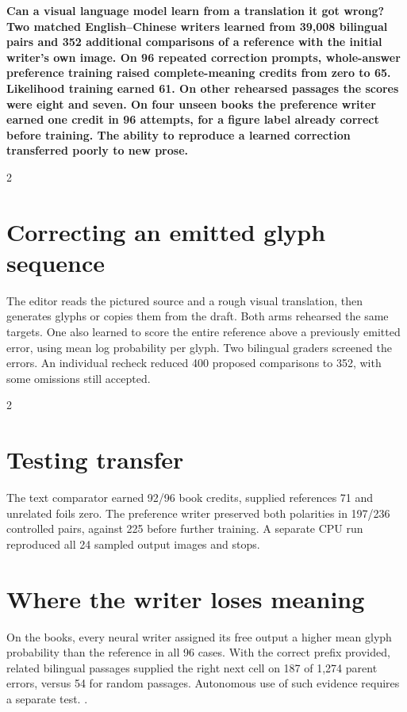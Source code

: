 \noindent\textbf{Can a visual language model learn from a translation it got wrong? Two matched English--Chinese writers learned from 39,008 bilingual pairs and 352 additional comparisons of a reference with the initial writer's own image. On 96 repeated correction prompts, whole-answer preference training raised complete-meaning credits from zero to 65. Likelihood training earned 61. On other rehearsed passages the scores were eight and seven. On four unseen books the preference writer earned one credit in 96 attempts, for a figure label already correct before training. The ability to reproduce a learned correction transferred poorly to new prose.}\par
\begin{multicols}{2}
\section*{Correcting an emitted glyph sequence}
The editor reads the pictured source and a rough visual translation, then generates glyphs or copies them from the draft.\cite{pointer} Both arms rehearsed the same targets. One also learned to score the entire reference above a previously emitted error, using mean log probability per glyph. Two bilingual graders screened the errors. An individual recheck reduced 400 proposed comparisons to 352, with some omissions still accepted.
\end{multicols}
\begin{multicols}{2}
\section*{Testing transfer}
The text comparator earned 92/96 book credits, supplied references 71 and unrelated foils zero. The preference writer preserved both polarities in 197/236 controlled pairs, against 225 before further training. A separate CPU run reproduced all 24 sampled output images and stops.
\section*{Where the writer loses meaning}
On the books, every neural writer assigned its free output a higher mean glyph probability than the reference in all 96 cases. With the correct prefix provided, related bilingual passages supplied the right next cell on 187 of 1,274 parent errors, versus 54 for random passages. Autonomous use of such evidence requires a separate test. .
\end{multicols}
